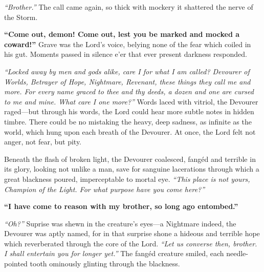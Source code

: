\documentclass{report}
\begin{document}
\textit{``Brother.''} The call came again, so thick with mockery it shattered the nerve of the Storm.

\textbf{``Come out, demon! Come out, lest you be marked and mocked a coward!''} Grave was the Lord's voice, belying none of the fear which coiled in his gut. Moments passed in silence e'er that ever present darkness responded.

\textit{``Locked away by men and gods alike, care I for what I am called? Devourer of Worlds, Betrayer of Hope, Nightmare, Revenant, these things they call me and more. For every name graced to thee and thy deeds, a dozen and one are cursed to me and mine. What care I one more?''} Words laced with vitriol, the Devourer raged—but through his words, the Lord could hear more subtle notes in hidden timbre. There could be no mistaking the heavy, deep sadness, as infinite as the world, which hung upon each breath of the Devourer. At once, the Lord felt not anger, not fear, but pity.

Beneath the flash of broken light, the Devourer coalesced, fangéd and terrible in its glory, looking not unlike a man, save for sanguine lacerations through which a great blackness poured, imperceptable to mortal eye. \textit{``This place is not yours, Champion of the Light. For what purpose have you come here?''}

\textbf{``I have come to reason with my brother, so long ago entombed.''}

\textit{``Oh?''} Suprise was shewn in the creature's eyes—a Nightmare indeed, the Devourer was aptly named, for in that surprise shone a hideous and terrible hope which reverberated through the core of the Lord. \textit{``Let us converse then, brother. I shall entertain you for longer yet.''} The fangéd creature smiled, each needle-pointed tooth ominously glinting through the blackness.
\end{document}
